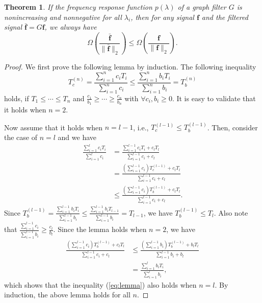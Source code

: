 \documentclass{article}
\newtheorem{theorem}{Theorem}
\begin{document}
\begin{theorem}
    If the frequency response function $p(\lambda)$ of a graph filter $G$ is nonincreasing and nonnegative for all $\lambda_i$, then for any signal $\bm f$ and the filtered signal $\bar{\bm f}=G\bm f$, we always have
    $$\Omega\left(\frac{\bar{\bm f}}{\lVert \bar{\bm f} \rVert_2}\right)\le\Omega\left(\frac{\bm f}{\lVert \bm f \rVert_2}\right).$$
\end{theorem}
\begin{proof}
    We first prove the following lemma by induction.
    The following inequality
    \begin{equation}\label{eq:lemma}
        T_c^{(n)}=\frac{\sum_{i=1}^n c_iT_i}{\sum_{i=1}^n c_i} \le \frac{\sum_{i=1}^n b_iT_i}{\sum_{i=1}^n b_i}=T_b^{(n)}
    \end{equation}
    holds, if $T_1\le\cdots\le T_n$ and $\frac{c_1}{b_1}\ge\cdots\ge\frac{c_n}{b_n}$ with $\forall c_i, b_i \ge 0$. It is easy to validate that it holds when $n=2$.

    Now assume that it holds when $n=l-1$, i.e., $T_c^{(l-1)}\le T_b^{(l-1)}$. Then, consider the case of $n=l$ and we have
    \begin{equation}
        \begin{split}
            \frac{\sum_{i=1}^l c_iT_i}{\sum_{i=1}^l c_i}
            &= \frac{\sum_{i=1}^{l-1} c_iT_i + c_l T_l}{\sum_{i=1}^{l-1} c_i + c_l}\\
            &= \frac{(\sum_{i=1}^{l-1}{c_i})T_c^{(l-1)} + c_l T_l}{\sum_{i=1}^{l-1} c_i + c_l}\\
            &\le \frac{(\sum_{i=1}^{l-1}{c_i})T_b^{(l-1)} + c_l T_l}{\sum_{i=1}^{l-1} c_i + c_l}.
        \end{split}
    \end{equation}
    Since $T_b^{(l-1)}=\frac{\sum_{i=1}^{l-1} b_iT_i}{\sum_{i=1}^{l-1} b_i} \le \frac{\sum_{i=1}^{l-1} b_iT_{l-1}}{\sum_{i=1}^{l-1} b_i}=T_{l-1}$, we have $T_b^{(l-1)}\le T_l$. Also note that $\frac{\sum_{i=1}^{l-1} c_i}{\sum_{i=1}^{l-1} b_i}\ge\frac{c_l}{b_l}$. Since the lemma holds when $n = 2$, we have
    \begin{equation}
        \begin{split}
            \frac{(\sum_{i=1}^{l-1}{c_i})T_b^{(l-1)} + c_l T_l}{\sum_{i=1}^{l-1} c_i + c_l}
            &\le \frac{(\sum_{i=1}^{l-1}{b_i})T_b^{(l-1)} + b_l T_l}{\sum_{i=1}^{l-1} b_i + b_l} \\
            &= \frac{\sum_{i=1}^l b_iT_i}{\sum_{i=1}^l b_i},
        \end{split}
    \end{equation}
    which shows that the inequality (\ref{eq:lemma}) also holds when $n=l$. By induction, the above lemma holds for all $n$.


\end{proof}
\end{document}

